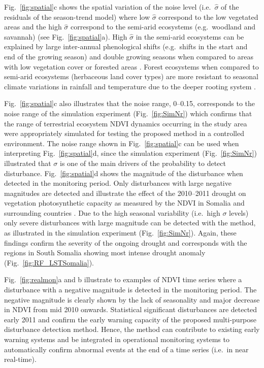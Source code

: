 \documentclass[authoryear,preprint,review,10pt]{elsarticle}
\begin{document}
Fig.~\ref{fig:spatial}c shows the spatial variation of the noise level (i.e.\ $\hat \sigma$ of the residuals of the season-trend model) where low $\hat \sigma$ correspond to the low vegetated areas and the high $\hat \sigma$ correspond to the semi-arid ecosystems (e.g.\ woodland and savannah) (see Fig.~\ref{fig:spatial}a). High $\hat \sigma$  in the semi-arid ecosystems can be explained by large inter-annual phenological shifts (e.g.\ shifts in the start and end of the growing season) and double growing seasons when compared to areas with low vegetation cover or forested areas \citep{Verbesselt:2010wo, Brown:2010fq}. Forest ecosystems when compared to semi-arid ecosystems (herbaceous land cover types) are more resistant to seasonal climate variations in rainfall and temperature due to the deeper rooting system \citep{Verbesselt2006}. 

Fig.~\ref{fig:spatial}c also illustrates that the noise range, 0--0.15, corresponds to the noise range of the simulation experiment (Fig.~\ref{fig:SimNr}) which confirms that the range of terrestrial ecosystem NDVI dynamics occurring in the study area were appropriately simulated for testing the proposed method in a controlled environment. 
The noise range shown in Fig.~\ref{fig:spatial}c can be used when interpreting Fig.~\ref{fig:spatial}d, since the simulation experiment (Fig.~\ref{fig:SimNr}) illustrated that $\sigma$ is one of the main drivers of the probability to detect disturbance. Fig.~\ref{fig:spatial}d shows the magnitude of the disturbance when detected in the monitoring period. Only disturbances with large negative magnitudes are detected and illustrate the effect of the 2010--2011 drought on vegetation photosynthetic capacity as measured by the NDVI in Somalia and surrounding countries \citep{Funk:2011fg}. Due to the high seasonal variability (i.e.\ high $\sigma$ levels) only severe disturbances with large magnitude can be detected with the method, as illustrated in the simulation experiment (Fig.~\ref{fig:SimNr}). Again, these findings confirm the severity of the ongoing drought and corresponds with the regions in South Somalia showing most intense drought anomaly (Fig.~\ref{fig:RF_LSTSomalia}).

Fig.~\ref{fig:realmon}a and b illustrate to examples of NDVI time series where a disturbance with a negative magnitude is detected in the monitoring period. The negative magnitude is clearly shown by the lack of seasonality and major decrease in NDVI from mid 2010 onwards. Statistical significant disturbances are detected early 2011 and confirm the early warning capacity of the proposed multi-purpose disturbance detection method. Hence, the method can contribute to existing early warning systems and be integrated in operational monitoring systems to automatically confirm abnormal events at the end of a time series (i.e.\ in near real-time). 
\end{document}
